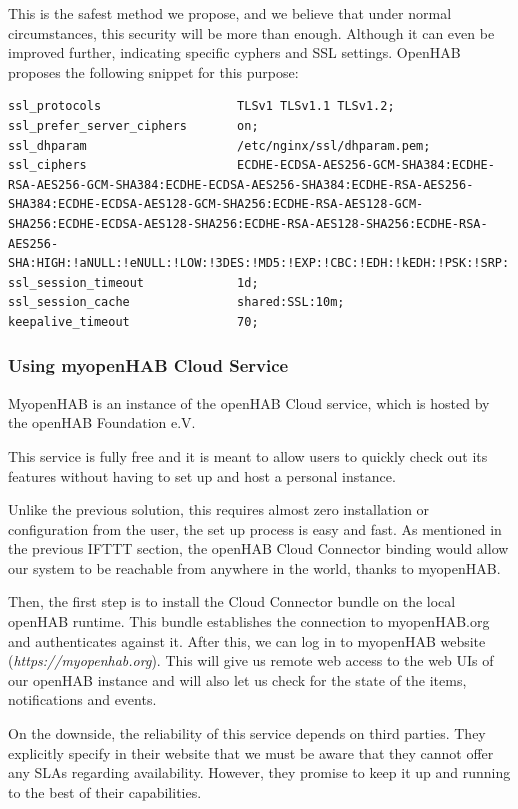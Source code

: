 This is the safest method we propose, and we believe that under normal circumstances, this security will be more than enough.
Although it can even be improved further, indicating specific cyphers and SSL settings. OpenHAB proposes the following snippet for
this purpose:

\begin{lstlisting}[style=Consola]
ssl_protocols                   TLSv1 TLSv1.1 TLSv1.2;
ssl_prefer_server_ciphers       on;
ssl_dhparam                     /etc/nginx/ssl/dhparam.pem;
ssl_ciphers                     ECDHE-ECDSA-AES256-GCM-SHA384:ECDHE-RSA-AES256-GCM-SHA384:ECDHE-ECDSA-AES256-SHA384:ECDHE-RSA-AES256-SHA384:ECDHE-ECDSA-AES128-GCM-SHA256:ECDHE-RSA-AES128-GCM-SHA256:ECDHE-ECDSA-AES128-SHA256:ECDHE-RSA-AES128-SHA256:ECDHE-RSA-AES256-SHA:HIGH:!aNULL:!eNULL:!LOW:!3DES:!MD5:!EXP:!CBC:!EDH:!kEDH:!PSK:!SRP:!kECDH;
ssl_session_timeout             1d;
ssl_session_cache               shared:SSL:10m;
keepalive_timeout               70;
\end{lstlisting}

\subsubsection{Using myopenHAB Cloud Service}
MyopenHAB is an instance of the openHAB Cloud service, which is hosted by the openHAB Foundation e.V.

This service is fully free and it is meant to allow users to quickly check out its features without having to set up and host a
personal instance.

Unlike the previous solution, this requires almost zero installation or configuration from the user, the set up process is easy
and fast. As mentioned in the previous IFTTT section, the openHAB Cloud Connector binding would allow our system to be reachable
from anywhere in the world, thanks to myopenHAB.

Then, the first step is to install the Cloud Connector bundle on the local openHAB runtime. This bundle establishes the connection
to myopenHAB.org and authenticates against it. After this, we can log in to myopenHAB website (\textit{https://myopenhab.org}).
This will give us remote web access to the web UIs of our openHAB instance and will also let us check for the state of the items,
notifications and events.

On the downside, the reliability of this service depends on third parties. They explicitly specify in their website\cite{myopenHAB}
that we must be aware that they cannot offer any SLAs regarding availability. However, they promise to keep it up and running to
the best of their capabilities.

